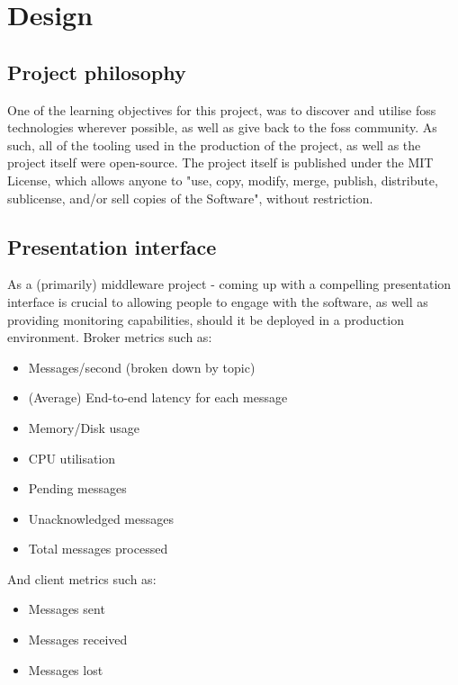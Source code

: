 \chapter{Design}
\label{chap:Design}

\section{Project philosophy}
\label{sec:Project philosophy}

One of the learning objectives for this project, was to discover and utilise
\gls{foss} technologies wherever possible, as well as give back to the
\gls{foss} community. As such, all of the tooling used in the production of the
project, as well as the project itself were open-source. The project itself is
published under the MIT License, which allows anyone to "use, copy, modify,
merge, publish, distribute, sublicense, and/or sell copies of the Software",
without restriction.

\section{Presentation interface}
\label{sec:presentation}

As a (primarily) middleware project - coming up with a compelling presentation
interface is crucial to allowing people to engage with the software, as well as
providing monitoring capabilities, should it be deployed in a production
environment. Broker metrics such as:

\begin{itemize}
  \item Messages/second (broken down by topic)
  \item (Average) End-to-end latency for each message
  \item Memory/Disk usage
  \item CPU utilisation
  \item Pending messages
  \item Unacknowledged messages
  \item Total messages processed
\end{itemize}

And client metrics such as:

\begin{itemize}
  \item Messages sent
  \item Messages received
  \item Messages lost
\end{itemize}

